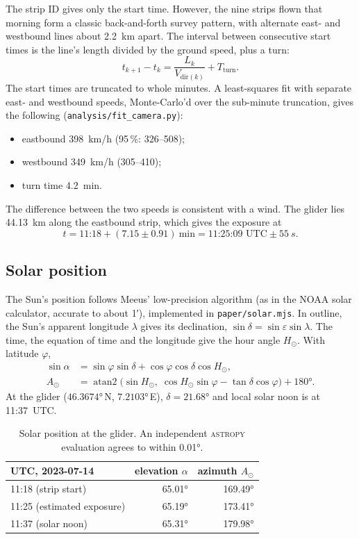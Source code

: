\documentclass[11pt,a4paper]{article}
\newcommand{\code}[1]{\texttt{#1}}
\begin{document}
The strip ID gives only the start time. However, the nine strips flown that morning form a
classic back-and-forth survey pattern, with alternate east- and westbound lines about \SI{2.2}{km} apart. The
interval between consecutive start times is the line's length divided by the ground speed, plus a
turn:
\begin{equation}
  t_{k+1} - t_k = \frac{L_k}{V_{\text{dir}(k)}} + T_{\text{turn}} .
\end{equation}
The start times are truncated to whole minutes. A least-squares fit with separate east- and
westbound speeds, Monte-Carlo'd over the sub-minute truncation, gives the following
(\code{analysis/fit\_camera.py}):
\begin{itemize}
  \item eastbound \SI{398}{km/h} (95\,\%: 326--508);
  \item westbound \SI{349}{km/h} (305--410);
  \item turn time \SI{4.2}{min}.
\end{itemize}
The difference between the two speeds is consistent with a wind. The glider lies \SI{44.13}{km} along the eastbound strip,
which gives the exposure at
\[
  t = \text{11:18} + (7.15\pm0.91)\ \text{min} = \text{11:25:09 UTC} \pm \SI{55}{s}.
\]

\subsection{Solar position}

The Sun's position follows Meeus' low-precision algorithm (as in the NOAA solar calculator,
accurate to about \ang{;1;}), implemented in \code{paper/solar.mjs}. In outline, the Sun's
apparent longitude $\lambda$ gives its declination, $\sin\delta = \sin\varepsilon\sin\lambda$.
The time, the equation of time and the longitude give the hour angle $H_\odot$. With latitude $\varphi$,
\begin{align}
  \sin\alpha &= \sin\varphi\sin\delta + \cos\varphi\cos\delta\cos H_\odot,\\
  A_\odot &= \operatorname{atan2}\!\bigl(\sin H_\odot,\;
             \cos H_\odot\sin\varphi - \tan\delta\cos\varphi\bigr) + \ang{180}.
\end{align}
At the glider ($\ang{46.3674}$\,N, $\ang{7.2103}$\,E), $\delta=\ang{21.68}$ and local
solar noon is at 11:37~UTC.

\begin{table}[ht]
\centering
\begin{tabular}{@{}lrr@{}}
\toprule
UTC, 2023-07-14 & elevation $\alpha$ & azimuth $A_\odot$ \\
\midrule
11:18 (strip start) & \ang{65.01} & \ang{169.49} \\
11:25 (estimated exposure) & \ang{65.19} & \ang{173.41} \\
11:37 (solar noon) & \ang{65.31} & \ang{179.98} \\
\bottomrule
\end{tabular}
\caption{Solar position at the glider. An independent \textsc{astropy} evaluation agrees to within \ang{0.01}.}
\label{tab:sun}
\end{table}
\end{document}

